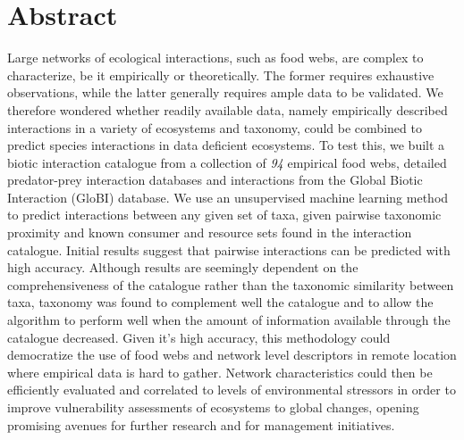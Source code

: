 \documentclass[letterpaper]{article}
\begin{document}




%
%

\newpage

\section{Abstract} %

Large networks of ecological interactions, such as food webs, are complex to characterize, be it empirically or theoretically. The former requires exhaustive observations, while the latter generally requires ample data to be validated. We therefore wondered whether readily available data, namely empirically described interactions in a variety of ecosystems and taxonomy, could be combined to predict species interactions in data deficient ecosystems. To test this, we built a biotic interaction catalogue from a collection of \textit{94} empirical food webs, detailed predator-prey interaction databases and interactions from the Global Biotic Interaction (GloBI) database. We use an unsupervised machine learning method to predict interactions between any given set of taxa, given pairwise taxonomic proximity and known consumer and resource sets found in the interaction catalogue. Initial results suggest that pairwise interactions can be predicted with high accuracy. Although results are seemingly dependent on the comprehensiveness of the catalogue rather than the taxonomic similarity between taxa, taxonomy was found to complement well the catalogue and to allow the algorithm to perform well when the amount of information available through the catalogue decreased. Given it’s high accuracy, this methodology could democratize the use of food webs and network level descriptors in remote location where empirical data is hard to gather. Network characteristics could then be efficiently evaluated and correlated to levels of environmental stressors in order to improve vulnerability assessments of ecosystems to global changes, opening promising avenues for further research and for management initiatives.
\end{document}
